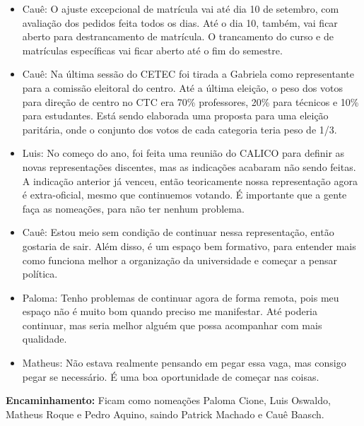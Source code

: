 \documentclass{ata-calico}
\begin{document}
\maketitle

\begin{itemize}
\item Cauê: O ajuste excepcional de matrícula vai até dia 10 de setembro, com avaliação dos pedidos feita todos os dias. Até o dia 10, também, vai ficar aberto para destrancamento de matrícula. O trancamento do curso e de matrículas específicas vai ficar aberto até o fim do semestre.
\item Cauê: Na última sessão do CETEC foi tirada a Gabriela como representante para a comissão eleitoral do centro. Até a última eleição, o peso dos votos para direção de centro no CTC era 70\% professores, 20\% para técnicos e 10\% para estudantes. Está sendo elaborada uma proposta para uma eleição paritária, onde o conjunto dos votos de cada categoria teria peso de 1/3.
\end{itemize}

\begin{itemize}
\item Luis: No começo do ano, foi feita uma reunião do CALICO para definir as novas representações discentes, mas as indicações acabaram não sendo feitas. A indicação anterior já venceu, então teoricamente nossa representação agora é extra-oficial, mesmo que continuemos votando. É importante que a gente faça as nomeações, para não ter nenhum problema.
\item Cauê: Estou meio sem condição de continuar nessa representação, então gostaria de sair. Além disso, é um espaço bem formativo, para entender mais como funciona melhor a organização da universidade e começar a pensar política.
\item Paloma: Tenho problemas de continuar agora de forma remota, pois meu espaço não é muito bom quando preciso me manifestar. Até poderia continuar, mas seria melhor alguém que possa acompanhar com mais qualidade.
\item Matheus: Não estava realmente pensando em pegar essa vaga, mas consigo pegar se necessário. É uma boa oportunidade de começar nas coisas.
\end{itemize}

\textbf{Encaminhamento:} Ficam como nomeações Paloma Cione, Luis Oswaldo, Matheus Roque e Pedro Aquino, saindo Patrick Machado e Cauê Baasch.
\end{document}
